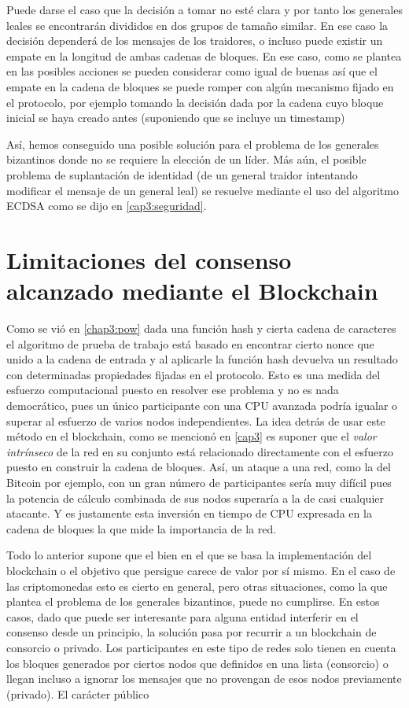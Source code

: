 Puede darse el caso que la decisión a tomar no esté clara y por tanto los generales leales se encontrarán divididos en dos grupos de tamaño similar. En ese caso la decisión dependerá de los mensajes de los traidores, o incluso puede existir un empate en la longitud de ambas cadenas de bloques. En ese caso, como se plantea en \citep{byzantine_generals} las posibles acciones se pueden considerar como igual de buenas así que el empate en la cadena de bloques se puede romper con algún mecanismo fijado en el protocolo, por ejemplo tomando la decisión dada por la cadena cuyo bloque inicial se haya creado antes (suponiendo que se incluye un timestamp)

Así, hemos conseguido una posible solución para el problema de los generales bizantinos donde no se requiere la elección de un líder. Más aún, el posible problema de suplantación de identidad (de un general traidor intentando modificar el mensaje de un general leal) se resuelve mediante el uso del algoritmo ECDSA como se dijo en \ref{cap3:seguridad}.
\section{Limitaciones del consenso alcanzado mediante el Blockchain}
Como se vió en \ref{chap3:pow} dada una función hash y cierta cadena de caracteres el algoritmo de prueba de trabajo está basado en encontrar cierto nonce que unido a la cadena de entrada y al aplicarle la función hash devuelva un resultado con determinadas propiedades fijadas en el protocolo. Esto es una medida del esfuerzo computacional puesto en resolver ese problema y no es nada democrático, pues un único participante con una CPU avanzada podría igualar o superar al esfuerzo de varios nodos independientes. La idea detrás de usar este método en el blockchain, como se mencionó en \ref{cap3} es suponer que el \textit{valor intrínseco} de la red en su conjunto está relacionado directamente con el esfuerzo puesto en construir la cadena de bloques. Así, un ataque a una red, como la del Bitcoin por ejemplo, con un gran número de participantes sería muy difícil pues la potencia de cálculo combinada de sus nodos superaría a la de casi cualquier atacante. Y es justamente esta inversión en tiempo de CPU expresada en la cadena de bloques la que mide la importancia de la red.

Todo lo anterior supone que el bien en el que se basa la implementación del blockchain o el objetivo que persigue carece de valor por sí mismo. En el caso de las criptomonedas esto es cierto en general, pero otras situaciones, como la que plantea el problema de los generales bizantinos, puede no cumplirse.
En estos casos, dado que puede ser interesante para alguna entidad interferir en el consenso desde un principio, la solución pasa por recurrir a un blockchain de consorcio o privado. Los participantes en este tipo de redes solo tienen en cuenta los bloques generados por ciertos nodos que definidos en una lista (consorcio) o llegan incluso a ignorar los mensajes que no provengan de esos nodos previamente (privado). El carácter público

